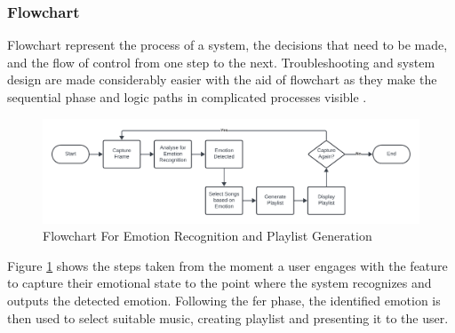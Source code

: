 \subsubsection{Flowchart}
Flowchart represent the process of a system, the decisions that need to be made, and the flow of control from one step to the next.
Troubleshooting and system design are made considerably easier with the aid of flowchart as they make the sequential phase and logic paths in complicated processes visible \citep{lucidchart_2019_what}.
\begin{figure}[H]
    \centering
    \includegraphics[width=16cm]{Images/flowchart.png}
    \caption{Flowchart For Emotion Recognition and Playlist Generation}
    \label{fig:flowchart-fer-pg}
\end{figure}
\indent Figure \ref{fig:flowchart-fer-pg} shows the steps taken from the moment a user engages with the feature to capture their emotional state to the point where the system recognizes and outputs the detected emotion.
Following the \gls{fer} phase, the identified emotion is then used to select suitable music, creating playlist and presenting it to the user. 
\\

